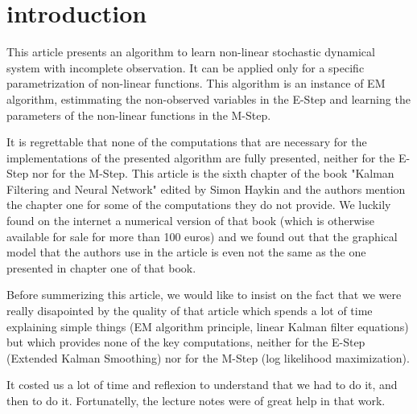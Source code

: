 \section*{introduction}

This article presents an algorithm to learn non-linear stochastic dynamical system with incomplete observation.
It can be applied only for a specific parametrization of non-linear functions.
This algorithm is an instance of EM algorithm, estimmating the non-observed variables in the E-Step and learning the parameters of the non-linear functions in the M-Step.

It is regrettable that none of the computations that are necessary for the implementations of the presented algorithm are fully presented, neither for the E-Step nor for the M-Step.
This article is the sixth chapter of the book "Kalman Filtering and Neural Network" edited by Simon Haykin and the authors mention the chapter one for some of the computations they do not provide.
We luckily found on the internet a numerical version of that book (which is otherwise available for sale for more than 100 euros) and we found out that the graphical model that the authors use in the article is even not the same as the one presented in chapter one of that book.

Before summerizing this article, we would like to insist on the fact that we were really disapointed by the quality of that article which spends a lot of time explaining simple things (EM algorithm principle, linear Kalman filter equations) but which provides none of the key computations, neither for the E-Step (Extended Kalman Smoothing) nor for the M-Step (log likelihood maximization).

It costed us a lot of time and reflexion to understand that we had to do it, and then to do it.
Fortunatelly, the lecture notes were of great help in that work.
